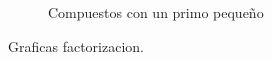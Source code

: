 \documentclass[12pt,spanish]{article}
\begin{document}
\begin{figure}[!htbp]
\begin{subfigure}{.5\textwidth}
				\caption{Compuestos con un primo pequeño}
				\label{fig:sfig23}
			\end{subfigure}
		\caption{Graficas factorizacion.}
		\label{fig:fig2}
		\end{figure}
\end{document}
